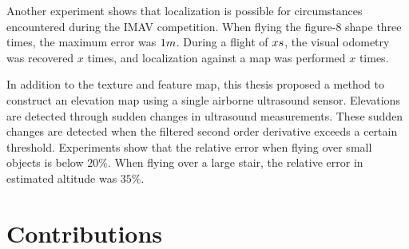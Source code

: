 Another experiment shows that localization is possible for circumstances encountered during the IMAV competition.
When flying the figure-8 shape three times, the maximum error was $1\small{m}$.
During a flight of $x\small{s}$, the visual odometry was recovered $x$ times, and localization against a map was performed $x$ times.

In addition to the texture and feature map, this thesis proposed a method to construct an elevation map using a single airborne ultrasound sensor.
Elevations are detected through sudden changes in ultrasound measurements.
These sudden changes are detected when the filtered second order derivative exceeds a certain threshold.
Experiments show that the relative error when flying over small objects is below $20\%$.
When flying over a large stair, the relative error in estimated altitude was $35\%$.








\begin{comment}
The main research question therefore is to determine a realtime Simultaneous Localization and Mapping approach that can be used for MAVs with a low-resolution down-pointing camera (e.g., AR.Drone).
This main research question is divided into several subquestions:
\begin{itemize}
\item How to construct (visual) a map from camera frames?
\item What camera resolution (e.g., $176 \times 144$ pixels) is required for localization against a map? What is the relationship between camera resolution and the localization performance?
\item What is the performance and robustness of different methods to estimate the transformation between a camera frame and a map?
\item Is localization on regular basis possible for circumstances encountered during the IMAV competition?
\item How to construct an elevation map with a single ultrasound sensor?
\end{itemize}
\end{comment}







\section{Contributions}
\label{sec:conclusions-contributions}

